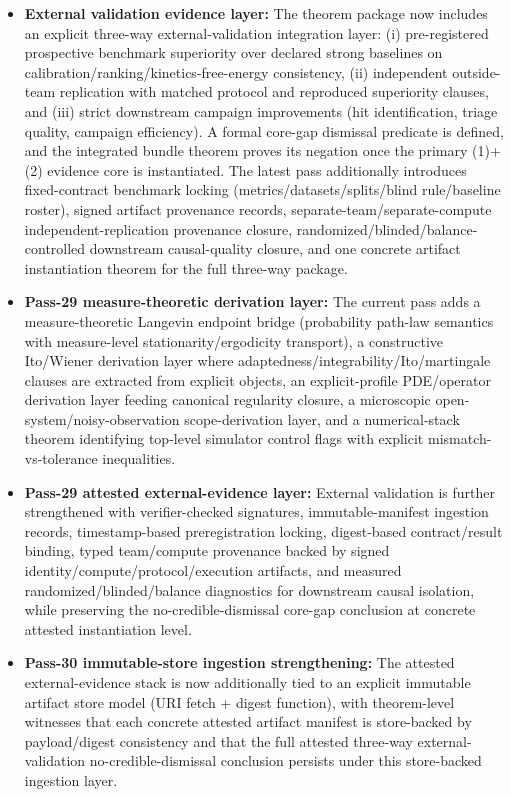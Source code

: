 \begin{itemize}
\item \textbf{External validation evidence layer:} The theorem package now includes an explicit three-way external-validation integration layer: (i) pre-registered prospective benchmark superiority over declared strong baselines on calibration/ranking/kinetics-free-energy consistency, (ii) independent outside-team replication with matched protocol and reproduced superiority clauses, and (iii) strict downstream campaign improvements (hit identification, triage quality, campaign efficiency). A formal core-gap dismissal predicate is defined, and the integrated bundle theorem proves its negation once the primary (1)+(2) evidence core is instantiated. The latest pass additionally introduces fixed-contract benchmark locking (metrics/datasets/splits/blind rule/baseline roster), signed artifact provenance records, separate-team/separate-compute independent-replication provenance closure, randomized/blinded/balance-controlled downstream causal-quality closure, and one concrete artifact instantiation theorem for the full three-way package.
\item \textbf{Pass-29 measure-theoretic derivation layer:} The current pass adds a measure-theoretic Langevin endpoint bridge (probability path-law semantics with measure-level stationarity/ergodicity transport), a constructive Ito/Wiener derivation layer where adaptedness/integrability/Ito/martingale clauses are extracted from explicit objects, an explicit-profile PDE/operator derivation layer feeding canonical regularity closure, a microscopic open-system/noisy-observation scope-derivation layer, and a numerical-stack theorem identifying top-level simulator control flags with explicit mismatch-vs-tolerance inequalities.
\item \textbf{Pass-29 attested external-evidence layer:} External validation is further strengthened with verifier-checked signatures, immutable-manifest ingestion records, timestamp-based preregistration locking, digest-based contract/result binding, typed team/compute provenance backed by signed identity/compute/protocol/execution artifacts, and measured randomized/blinded/balance diagnostics for downstream causal isolation, while preserving the no-credible-dismissal core-gap conclusion at concrete attested instantiation level.
\item \textbf{Pass-30 immutable-store ingestion strengthening:} The attested external-evidence stack is now additionally tied to an explicit immutable artifact store model (URI fetch + digest function), with theorem-level witnesses that each concrete attested artifact manifest is store-backed by payload/digest consistency and that the full attested three-way external-validation no-credible-dismissal conclusion persists under this store-backed ingestion layer.

\end{itemize}

